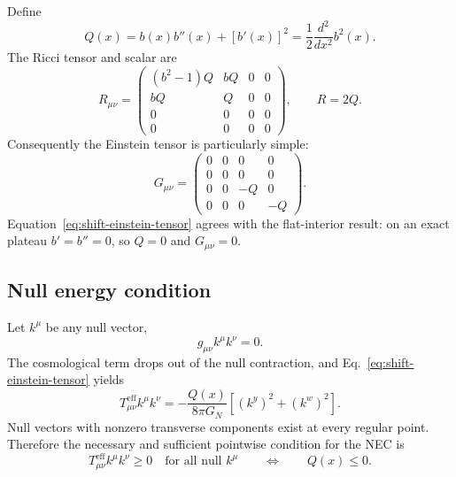 Define
\begin{equation}
  Q(x)
  =
  b(x)b''(x)
  +
  [b'(x)]^2
  =
  \frac{1}{2}
  \frac{d^2}{dx^2}
  b^2(x).
  \label{eq:shift-curvature-functional}
\end{equation}
The Ricci tensor and scalar are
\begin{equation}
  R_{\mu\nu}
  =
  \begin{pmatrix}
    (b^2-1)Q & bQ & 0 & 0 \\
    bQ & Q & 0 & 0 \\
    0 & 0 & 0 & 0 \\
    0 & 0 & 0 & 0
  \end{pmatrix},
  \qquad
  R
  =
  2Q.
  \label{eq:shift-ricci-tensor}
\end{equation}
Consequently the Einstein tensor is particularly simple:
\begin{equation}
  G_{\mu\nu}
  =
  \begin{pmatrix}
    0 & 0 & 0 & 0 \\
    0 & 0 & 0 & 0 \\
    0 & 0 & -Q & 0 \\
    0 & 0 & 0 & -Q
  \end{pmatrix}.
  \label{eq:shift-einstein-tensor}
\end{equation}
Equation~\eqref{eq:shift-einstein-tensor} agrees with the flat-interior result:
on an exact plateau \(b'=b''=0\), so \(Q=0\) and
\(G_{\mu\nu}=0\).

\subsection{Null energy condition}

Let \(k^\mu\) be any null vector,
\begin{equation}
  g_{\mu\nu}k^\mu k^\nu
  =
  0.
  \label{eq:null-vector-condition}
\end{equation}
The cosmological term drops out of the null contraction, and
Eq.~\eqref{eq:shift-einstein-tensor} yields
\begin{equation}
  T_{\mu\nu}^{\mathrm{eff}}
  k^\mu k^\nu
  =
  -\frac{Q(x)}{8\pi G_N}
  \left[
    (k^y)^2+(k^w)^2
  \right].
  \label{eq:nec-contraction}
\end{equation}
Null vectors with nonzero transverse components exist at every regular point.
Therefore the necessary and sufficient pointwise condition for the NEC is
\begin{equation}
  T_{\mu\nu}^{\mathrm{eff}}
  k^\mu k^\nu
  \geq0
  \quad
  \text{for all null }k^\mu
  \qquad
  \Longleftrightarrow
  \qquad
  Q(x)\leq0.
  \label{eq:nec-condition-q}
\end{equation}

